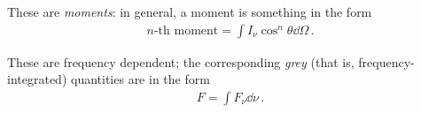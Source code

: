 \documentclass[main.tex]{subfiles}
\begin{document}
These are \emph{moments}: in general, a moment is something in the form 
%
\begin{align}
\text{\(n\)-th moment} = \int I_{\nu } \cos^{n} \theta \dd{\Omega }
\,.
\end{align}

These are frequency dependent; the corresponding \emph{grey} (that is, frequency-integrated) quantities are in the form 
%
\begin{align}
F = \int F_{\nu } \dd{\nu }
\,.
\end{align}
\end{document}
